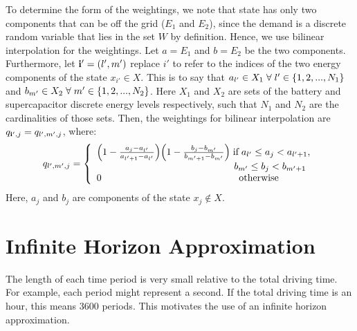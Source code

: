 \documentclass[conference]{IEEEtran}
\begin{document}
To determine the form of the weightings, we note that  state has only two components that can be off the grid ($E_{1}$ and $E_{2}$), since the demand is a discrete random variable that lies in the set $W$ by definition. Hence, we use bilinear interpolation for the weightings. Let $a=E_{1}$ and $b=E_{2}$ be the two components. Furthermore, let $\bold{i'}=(l',m')$ replace $i'$ to refer to the indices of the two energy components of the state $x_{i'}\in X$. This is to say that $a_{l'}\in X_{1}\hspace{0.1cm}\forall\hspace{0.1cm}l'\in\{1,2,..., N_{1}\}$ and $b_{m'}\in X_{2}\hspace{0.1cm}\forall\hspace{0.1cm} m'\in\{1,2,..., N_{2}\}$. Here $X_{1}$ and $X_{2}$ are sets of the battery and supercapacitor discrete energy levels respectively, such that $N_{1}$ and $N_{2}$ are the cardinalities of those sets. Then, the weightings for bilinear interpolation are $q_{\bold{i'},j}=q_{l',m',j}$, where:
\begin{displaymath}q_{l',m',j}=
\left\{
\begin{array}{l}
\Big(1-\frac{a_{j}-a_{l'}}{a_{l'+1}-a_{l'}}\Big)\Big(1-\frac{b_{j}-b_{m'}}{b_{m'+1}-b_{m'}}\Big)\hspace{0.1cm} \text{if} \hspace{0.1cm} a_{l'}\leq a_{j}< a_{l'+1},\\ \hspace{5cm}b_{m'}\leq b_{j}< b_{m'+1}\\
0		   \hspace{5cm} \text{otherwise}
\end{array}
\right.
\end{displaymath} Here, $a_{j}$ and $b_{j}$ are components of the state $x_{j}\not\in X$.


\section{Infinite Horizon Approximation}
The length of each time period is very small relative to the total driving time. For example, each period might represent a second. If the total driving time is an hour, this means 3600 periods. This motivates the use of an infinite horizon approximation.
\end{document}
